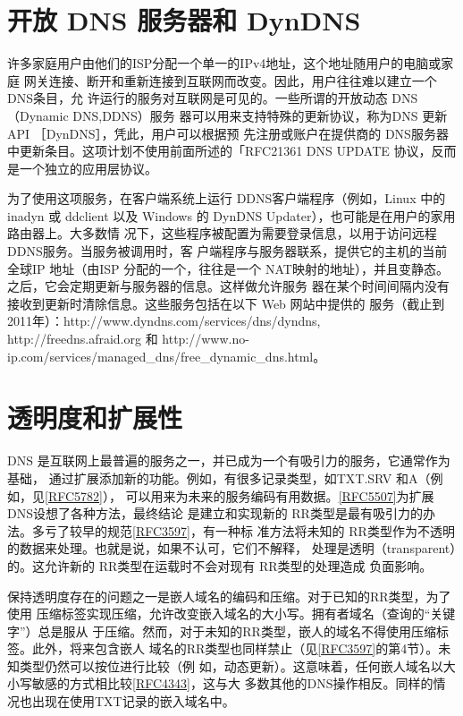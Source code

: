 \section{开放 DNS 服务器和 DynDNS}

许多家庭用户由他们的ISP分配一个单一的IPv4地址，这个地址随用户的电脑或家庭
网关连接、断开和重新连接到互联网而改变。因此，用户往往难以建立一个 DNS条目，允
许运行的服务对互联网是可见的。一些所谓的开放动态 DNS（Dynamic DNS,DDNS）服务
器可以用来支持特殊的更新协议，称为DNS 更新 API ［DynDNS］，凭此，用户可以根据预
先注册或账户在提供商的 DNS服务器中更新条目。这项计划不使用前面所述的「RFC21361
DNS UPDATE 协议，反而是一个独立的应用层协议。

为了使用这项服务，在客户端系统上运行 DDNS客户端程序（例如，Linux 中的 inadyn
或 ddclient 以及 Windows 的 DynDNS Updater），也可能是在用户的家用路由器上。大多数情
况下，这些程序被配置为需要登录信息，以用于访问远程DDNS服务。当服务被调用时，客
户端程序与服务器联系，提供它的主机的当前全球IP 地址（由ISP 分配的一个，往往是一个
NAT映射的地址），并且变静态。之后，它会定期更新与服务器的信息。这样做允许服务
器在某个时间间隔内没有接收到更新时清除信息。这些服务包括在以下 Web 网站中提供的
服务（截止到2011年）：http://www.dyndns.com/services/dns/dyndns,
http://freedns.afraid.org
和 http://www.no-ip.com/services/managed\_dns/free\_dynamic\_dns.html。

\section{透明度和扩展性}

DNS 是互联网上最普遍的服务之一，并已成为一个有吸引力的服务，它通常作为基础，
通过扩展添加新的功能。例如，有很多记录类型，如TXT.SRV
和A（例如，见\href{https://www.rfc-editor.org/rfc/rfc5782}{[RFC5782]}），
可以用来为未来的服务编码有用数据。\href{https://www.rfc-editor.org/rfc/rfc5507}{[RFC5507]}为扩展
DNS设想了各种方法，最终结论
是建立和实现新的
RR类型是最有吸引力的办法。多亏了较早的规范\href{https://www.rfc-editor.org/rfc/rfc3597}{[RFC3597]}，有一种标
准方法将未知的 RR类型作为不透明的数据来处理。也就是说，如果不认可，它们不解释，
处理是透明（transparent）的。这允许新的 RR类型在运载时不会对现有 RR类型的处理造成
负面影响。

保持透明度存在的问题之一是嵌人域名的编码和压缩。对于已知的RR类型，为了使用
压缩标签实现压缩，允许改变嵌入域名的大小写。拥有者域名（查询的“关键字”）总是服从
于压缩。然而，对于未知的RR类型，嵌人的域名不得使用压缩标签。此外，将来包含嵌人
域名的RR类型也同样禁止（见\href{https://www.rfc-editor.org/rfc/rfc3597}{[RFC3597]}的第4节）。未知类型仍然可以按位进行比较（例
如，动态更新）。这意味着，任何嵌人域名以大小写敏感的方式相比较\href{https://www.rfc-editor.org/rfc/rfc4343}{[RFC4343]}，这与大
多数其他的DNS操作相反。同样的情况也出现在使用TXT记录的嵌入域名中。

